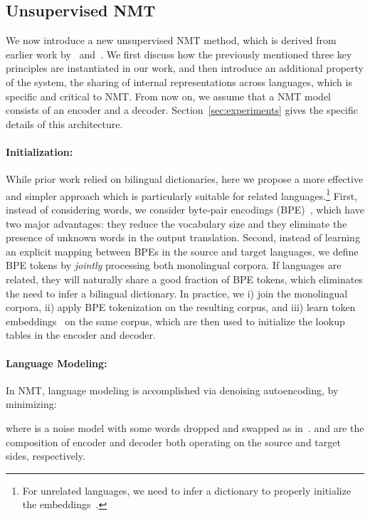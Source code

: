 \documentclass[11pt,a4paper]{article}
\begin{document}
\subsection{Unsupervised NMT} \label{sec:nmt}
We now introduce a new unsupervised NMT method, which is derived from earlier work by~\citet{unsupNMTartetxe} and~\citet{unsupNMTlample}. We first discuss how the previously mentioned three key principles are instantiated in our work, and then introduce an additional property of the system, the sharing of internal representations across languages, which is specific and critical to NMT. From now on, we assume that a NMT model consists of an encoder and a decoder. Section~\ref{sec:experiments} gives the specific details of this architecture.

\paragraph{Initialization: }
While prior work relied on  bilingual dictionaries, here we propose a more effective and simpler approach which is particularly suitable for related languages.\footnote{For unrelated languages, we need to infer a dictionary to properly initialize the embeddings~\cite{wordalign17}.} First, instead of considering words, we consider byte-pair encodings (BPE)~\cite{sennrich2015neural}, which have two major advantages: they reduce the vocabulary size and they eliminate the presence of unknown words in the output translation. Second, instead of learning an explicit mapping between BPEs in the source and target languages, we define BPE tokens by \textit{jointly} processing both monolingual corpora. If languages are related, they will naturally share a good fraction of BPE tokens, which eliminates the need to infer a bilingual dictionary. In practice, we i) join the monolingual corpora, ii) apply BPE tokenization on the resulting corpus, and iii) learn token embeddings~\citep{mikolov2013distributed}  on the same corpus, which are then used to initialize the lookup tables in the encoder and decoder. 

\paragraph{Language Modeling: } In NMT, language modeling is accomplished via denoising autoencoding, by minimizing:

where  is a noise model with some words dropped and swapped as in~\citet{unsupNMTlample}.  and  are  the composition of encoder and decoder both operating on the source and target sides, respectively. 
\end{document}
